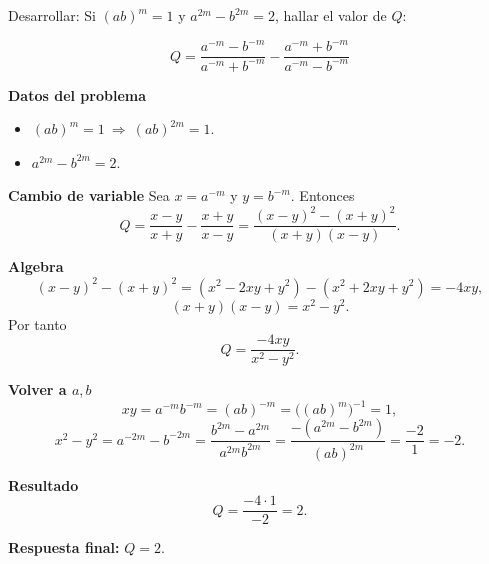 \begin{ejercicio}[
  id=MATU_ALG_007,
  materia_principal=matematicas_preuniversitaria,
  codigo_materia=MATU,
  capitulo=algebra,
  subtema=exponentes,
  nivel=intermedio,
  procedencia="Problemas Resueltos de Matemática",
  visibilidad=web_impreso,
  tiempo_estimado=6,
  libros={matematicas_pre},
  dificultad=3,
  mostrar_solucion=true,
  tags={exponentes, fracciones, sustitucion}
]

Desarrollar:  
Si $(ab)^m = 1$ y $a^{2m} - b^{2m} = 2$, hallar el valor de $Q$:

\[
Q = \frac{a^{-m} - b^{-m}}{a^{-m} + b^{-m}} - \frac{a^{-m} + b^{-m}}{a^{-m} - b^{-m}}
\]

\begin{solucion}

\textbf{Datos del problema}
\begin{itemize}
    \item $(ab)^m=1 \ \Rightarrow\ (ab)^{2m}=1$.
    \item $a^{2m}-b^{2m}=2$.
\end{itemize}

\textbf{Cambio de variable}  
Sea $x=a^{-m}$ y $y=b^{-m}$. Entonces
\[
Q=\frac{x-y}{x+y}-\frac{x+y}{x-y}
  =\frac{(x-y)^2-(x+y)^2}{(x+y)(x-y)}.
\]

\textbf{Algebra}  
\[
(x-y)^2-(x+y)^2=(x^2-2xy+y^2)-(x^2+2xy+y^2)=-4xy,
\]
\[
(x+y)(x-y)=x^2-y^2.
\]
Por tanto
\[
Q=\frac{-4xy}{x^2-y^2}.
\]

\textbf{Volver a $a,b$}  
\[
xy=a^{-m}b^{-m}=(ab)^{-m}=\big((ab)^m\big)^{-1}=1,
\]
\[
x^2-y^2=a^{-2m}-b^{-2m}
=\frac{b^{2m}-a^{2m}}{a^{2m}b^{2m}}
=\frac{-(a^{2m}-b^{2m})}{(ab)^{2m}}
=\frac{-2}{1}=-2.
\]

\textbf{Resultado}  
\[
Q=\frac{-4\cdot 1}{-2}=2.
\]

\textbf{Respuesta final:} $\boxed{Q=2}$.

\end{solucion}

\end{ejercicio}
